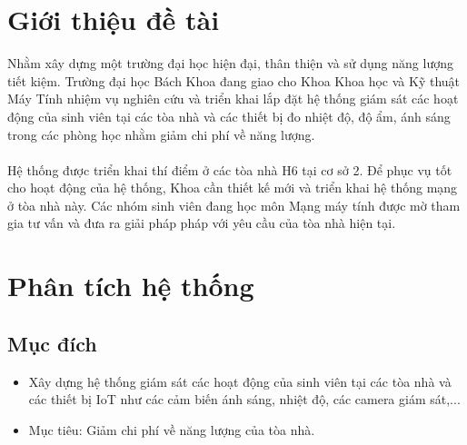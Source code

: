 \documentclass[12pt]{report}
\begin{document}

\tableofcontents
\pagebreak

\renewcommand{\thesection}{\arabic{section}}

\section{Giới thiệu đề tài}

	Nhằm xây dựng một trường đại học hiện đại, thân thiện và sử dụng năng lượng
tiết kiệm. Trường đại học Bách Khoa đang giao cho Khoa Khoa học và Kỹ thuật Máy
Tính nhiệm vụ nghiên cứu và triển khai lắp đặt hệ thống giám sát các hoạt động của
sinh viên tại các tòa nhà và các thiết bị đo nhiệt độ, độ ẩm, ánh sáng trong các phòng
học nhằm giảm chi phí về năng lượng. \\\\
	Hệ thống được triển khai thí điểm ở các tòa
nhà H6 tại cơ sở 2. Để phục vụ tốt cho hoạt động của hệ thống, Khoa cần thiết kế
mới và triển khai hệ thống mạng ở tòa nhà này. Các nhóm sinh viên đang học môn
Mạng máy tính được mờ tham gia tư vấn và đưa ra giải pháp pháp với yêu cầu của
tòa nhà hiện tại.

\section{Phân tích hệ thống}
	\subsection{Mục đích}
		\begin{itemize}
			\item Xây dựng hệ thống giám sát các hoạt động của sinh viên tại các tòa nhà và các thiết bị IoT như các cảm biến ánh sáng, nhiệt độ, các camera giám sát,...
			\item Mục tiêu: Giảm chi phí về năng lượng của tòa nhà.
		\end{itemize}
\end{document}

